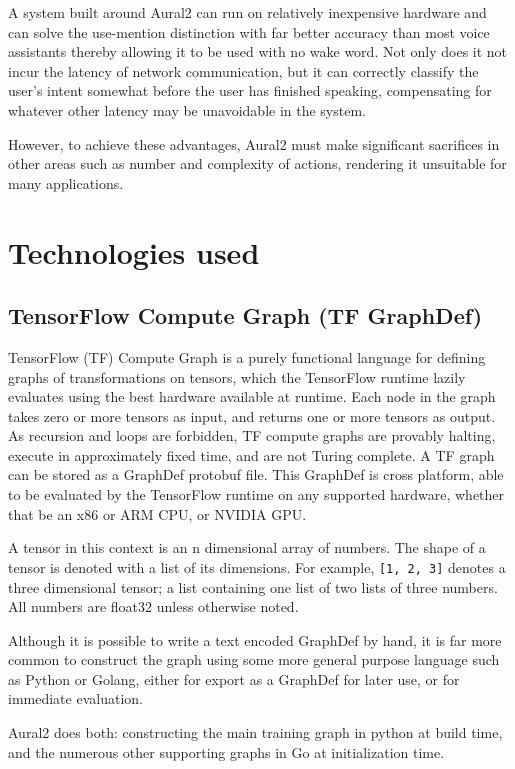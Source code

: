 \documentclass[conference]{IEEEtran}
\begin{document}
A system built around Aural2 can run on relatively inexpensive hardware
and can solve the use-mention distinction with far better accuracy than most voice assistants thereby allowing it to be used with no wake word.
Not only does it not incur the latency of network communication, but it can correctly classify the user's intent somewhat before the user has finished speaking,
compensating for whatever other latency may be unavoidable in the system.

However, to achieve these advantages, Aural2 must make significant sacrifices in other areas such as number and complexity of actions,
rendering it unsuitable for many applications.

\section{Technologies used}

\subsection{TensorFlow Compute Graph (TF GraphDef)}

TensorFlow (TF) Compute Graph is a purely functional language for
defining graphs of transformations on tensors, which the TensorFlow
runtime lazily evaluates using the best hardware available at runtime.
Each node in the graph takes zero or more tensors as input, and returns
one or more tensors as output. As recursion and loops are forbidden,
TF compute graphs are provably halting,
execute in approximately fixed time, and are not Turing complete.
A TF graph can be stored as a GraphDef protobuf file.
This GraphDef is cross platform, able to be evaluated by the TensorFlow runtime on any supported hardware,
whether that be an x86 or ARM CPU, or NVIDIA GPU.

A tensor in this context is an n dimensional array of numbers. The shape
of a tensor is denoted with a list of its dimensions. For example, \texttt{[1, 2, 3]} denotes a three dimensional tensor;
a list containing one list of two lists of three numbers.
All numbers are float32 unless otherwise noted.

Although it is possible to write a text encoded GraphDef by hand, it is
far more common to construct the graph using some more general purpose
language such as Python or Golang, either for export as a GraphDef
for later use, or for immediate evaluation.

Aural2 does both: constructing the main training graph in python at
build time, and the numerous other supporting graphs in Go at
initialization time.
\end{document}
